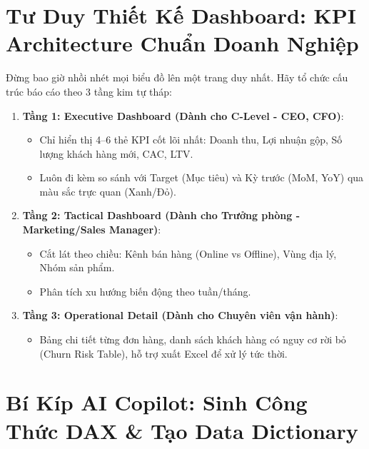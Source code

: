 \section{Tư Duy Thiết Kế Dashboard: KPI Architecture Chuẩn Doanh Nghiệp}

\begin{thuchanhbox}
Đừng bao giờ nhồi nhét mọi biểu đồ lên một trang duy nhất. Hãy tổ chức cấu trúc báo cáo theo 3 tầng kim tự tháp:
\begin{enumerate}
    \item \textbf{Tầng 1: Executive Dashboard (Dành cho C-Level - CEO, CFO)}:
    \begin{itemize}
        \item Chỉ hiển thị 4--6 thẻ KPI cốt lõi nhất: Doanh thu, Lợi nhuận gộp, Số lượng khách hàng mới, CAC, LTV.
        \item Luôn đi kèm so sánh với Target (Mục tiêu) và Kỳ trước (MoM, YoY) qua màu sắc trực quan (Xanh/Đỏ).
    \end{itemize}
    \item \textbf{Tầng 2: Tactical Dashboard (Dành cho Trưởng phòng - Marketing/Sales Manager)}:
    \begin{itemize}
        \item Cắt lát theo chiều: Kênh bán hàng (Online vs Offline), Vùng địa lý, Nhóm sản phẩm.
        \item Phân tích xu hướng biến động theo tuần/tháng.
    \end{itemize}
    \item \textbf{Tầng 3: Operational Detail (Dành cho Chuyên viên vận hành)}:
    \begin{itemize}
        \item Bảng chi tiết từng đơn hàng, danh sách khách hàng có nguy cơ rời bỏ (Churn Risk Table), hỗ trợ xuất Excel để xử lý tức thời.
    \end{itemize}
\end{enumerate}
\end{thuchanhbox}

\section{Bí Kíp AI Copilot: Sinh Công Thức DAX \& Tạo Data Dictionary}

